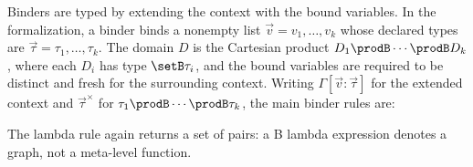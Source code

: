 Binders are typed by extending the context with the bound variables.
In the formalization, a binder binds a nonempty list \(\vec v = v_1,\ldots,v_k\) whose declared types are \(\vec \tau = \tau_1,\ldots,\tau_k\).
The domain \(D\) is the Cartesian product \(D_1 \prodB \cdots \prodB D_k\), where each \(D_i\) has type \(\setB \tau_i\), and the bound variables are required to be distinct and fresh for the surrounding context.
Writing \(\Gamma[\vec v : \vec \tau]\) for the extended context and \(\vec \tau^\times\) for \(\tau_1 \prodB \cdots \prodB \tau_k\), the main binder rules are:
The lambda rule again returns a set of pairs: a B lambda expression denotes a graph, not a meta-level function.
